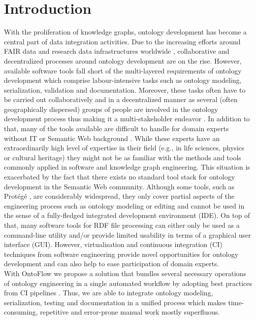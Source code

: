 \documentclass[runningheads]{llncs}
\begin{document}

\section{Introduction}
With the proliferation of knowledge graphs, ontology development has become a central part of data integration activities. Due to the increasing efforts around FAIR data and research data infrastructures worldwide \cite{fair}, collaborative and decentralized processes around ontology development are on the rise. However, available software tools fall short of the multi-layered requirements of ontology development which comprise labour-intensive tasks such as ontology modeling, serialization, validation and documentation. Moreover, these tasks often have to be carried out collaboratively and in a decentralized manner as several (often geographically dispersed) groups of people are involved in the ontology development process thus making it a multi-stakeholder endeavor \cite{sure}. In addition to that, many of the tools available are difficult to handle for domain experts without IT or Semantic Web background \cite{tudorache}. While these experts have an extraordinarily high level of expertise in their field (e.g., in life sciences, physics or cultural heritage) they might not be as familiar with the methods and tools commonly applied in software and knowledge graph engineering. This situation is exacerbated by the fact that there exists no standard tool stack for ontology development in the Semantic Web community. Although some tools, such as Protégé \cite{protege}, are considerably widespread, they only cover partial aspects of the engineering process such as ontology modeling or editing and cannot be used in the sense of a fully-fledged integrated development environment (IDE). On top of that, many software tools for RDF file processing can either only be used as a command-line utility and/or provide limited usability in terms of a graphical user interface (GUI). However, virtualisation and continuous integration (CI) techniques from software engineering provide novel opportunities for ontology development \cite{fowler} and can also help to ease participation of domain experts.\\
With OntoFlow we propose a solution that bundles several necessary operations of ontology engineering in a single automated workflow by adopting best practices from CI pipelines \cite{humble}. Thus, we are able to integrate ontology modeling, serialization, testing and documentation in a unified process which makes time-consuming, repetitive and error-prone manual work mostly superfluous.
\end{document}
